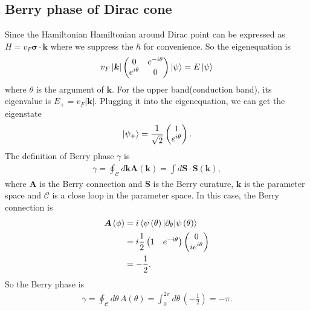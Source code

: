 \documentclass[10pt, oneside]{article}
\newcommand{\te}{\theta}
\newcommand{\p}[1]{\left(#1\right)}
\newcommand{\bv}[1]{\left|#1\right|}
\begin{document}
\subsection{Berry phase of Dirac cone}
Since the Hamiltonian Hamiltonian around Dirac point can be expressed as \(H = v_{F} \bm{\sigma} \cdot \bm{k}\) where we suppress the \(\hbar\) for convenience. So the eigenequation is 
\begin{align}
	v_{F} \bv{\bm{k}}
	\begin{pmatrix}
		0 & e^{-i \te} \\
		e^{i \te} & 0 
	\end{pmatrix} \ket{\psi} = E \ket{\psi} 
\end{align}
where \(\te\) is the argument of \(\bm{k}\). For the upper band(conduction band), its eigenvalue is \(E_{+} = v_{F} \bv{\bm{k}}\). Plugging it into the eigenequation, we can get the eigenstate
\begin{align}
	\ket{\psi_{+}} = \frac{1}{\sqrt{2}} \begin{pmatrix}
		1 \\
		e^{i \te}
	\end{pmatrix}.
\end{align}
The definition of Berry phase \(\gamma\) is 
\begin{align}
	\gamma = \oint_{\mathcal{{C}}} d \bm{k} \bm{A} \p{\bm{k}} = \int d \bm{S} \cdot \bm{S} \p{\bm{k}},
\end{align}
where \(\bm{A}\) is the Berry connection and \(\bm{S}\) is the Berry curature, \(\bm{k}\) is the parameter space and \(\mathcal{C}\) is a close loop in the parameter space. In this case, the Berry connection is
\begin{align}
	\begin{split}
		\bm{A} \p{\phi} & = i \braket{\psi \p{\te} | \partial_{\te} | \psi \p{\te}} \\
		& = i \frac{1}{2} \begin{pmatrix}
			1 & e^{-i \te}
		\end{pmatrix} \begin{pmatrix}
			0 \\
			i e^{i \te}
		\end{pmatrix} \\
		& = -\frac{1}{2}.
	\end{split} 
\end{align}
So the Berry phase is
\begin{align}
	\gamma = \oint_{\mathcal{C}} d \te \, A \p{\te} = \int_{0}^{2 \pi} d \te \, \p{-\frac{1}{2}} = - \pi.
\end{align}	
\end{document}
